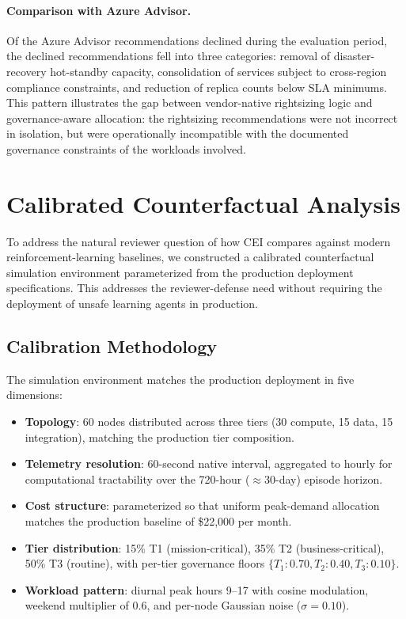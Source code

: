 \documentclass[runningheads]{llncs}
\begin{document}
\paragraph{Comparison with Azure Advisor.} Of the Azure Advisor recommendations declined during the evaluation period, the declined recommendations fell into three categories: removal of disaster-recovery hot-standby capacity, consolidation of services subject to cross-region compliance constraints, and reduction of replica counts below SLA minimums. This pattern illustrates the gap between vendor-native rightsizing logic and governance-aware allocation: the rightsizing recommendations were not incorrect in isolation, but were operationally incompatible with the documented governance constraints of the workloads involved.

\section{Calibrated Counterfactual Analysis}
\label{sec:counterfactual}

To address the natural reviewer question of how CEI compares against modern reinforcement-learning baselines, we constructed a calibrated counterfactual simulation environment parameterized from the production deployment specifications. This addresses the reviewer-defense need without requiring the deployment of unsafe learning agents in production.

\subsection{Calibration Methodology}

The simulation environment matches the production deployment in five dimensions:
\begin{itemize}
\item \textbf{Topology}: 60 nodes distributed across three tiers (30 compute, 15 data, 15 integration), matching the production tier composition.
\item \textbf{Telemetry resolution}: 60-second native interval, aggregated to hourly for computational tractability over the 720-hour ($\approx$30-day) episode horizon.
\item \textbf{Cost structure}: parameterized so that uniform peak-demand allocation matches the production baseline of \$22{,}000 per month.
\item \textbf{Tier distribution}: 15\% T1 (mission-critical), 35\% T2 (business-critical), 50\% T3 (routine), with per-tier governance floors $\{T_1: 0.70, T_2: 0.40, T_3: 0.10\}$.
\item \textbf{Workload pattern}: diurnal peak hours 9--17 with cosine modulation, weekend multiplier of 0.6, and per-node Gaussian noise ($\sigma = 0.10$).
\end{itemize}
\end{document}
